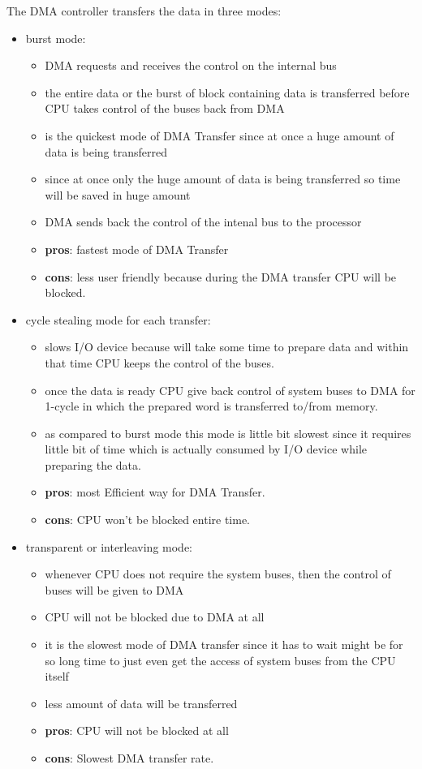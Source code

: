 The DMA controller transfers the data in three modes:
\begin{itemize}
    \item burst mode:
    \begin{itemize}
        \item DMA requests and receives the control on the internal bus
        \item the entire data or the burst of block containing data is transferred before CPU takes control of the buses back from DMA
        \item is the quickest mode of DMA Transfer since at once a huge amount of data is being transferred
        \item since at once only the huge amount of data is being transferred so time will be saved in huge amount
        \item DMA sends back the control of the intenal bus to the processor
        \item {\bf pros}: fastest mode of DMA Transfer
        \item {\bf cons}: less user friendly because during the DMA transfer CPU will be blocked.
    \end{itemize}
    \item cycle stealing mode for each transfer:
    \begin{itemize}
        \item slows I/O device because will take some time to prepare data and within that time CPU keeps the control of the buses.
        \item once the data is ready CPU give back control of system buses to DMA for 1-cycle in which the prepared word is transferred to/from memory.
        \item as compared to burst mode this mode is little bit slowest since it requires little bit of time which is actually consumed by I/O device while preparing the data.
        \item {\bf pros}: most Efficient way for DMA Transfer.
        \item {\bf cons}: CPU won’t be blocked entire time.
    \end{itemize}
    \item transparent or interleaving mode:
    \begin{itemize}
        \item whenever CPU does not require the system buses, then the control of buses will be given to DMA
        \item CPU will not be blocked due to DMA at all
        \item it is the slowest mode of DMA transfer since it has to wait might be for so long time to just even get the access of system buses from the CPU itself
        \item less amount of data will be transferred
        \item {\bf pros}: CPU will not be blocked at all
        \item {\bf cons}: Slowest DMA transfer rate.
    \end{itemize}
\end{itemize}

